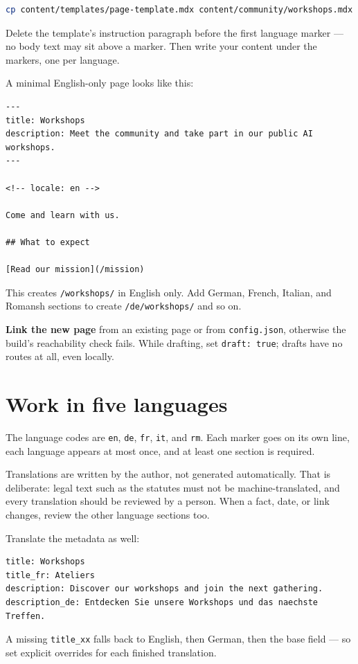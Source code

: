 \documentclass[11pt]{book}
\begin{document}
\begin{lstlisting}[language=bash]
cp content/templates/page-template.mdx content/community/workshops.mdx
\end{lstlisting}

Delete the template's instruction paragraph before the first language marker --- no body text may sit above a marker. Then write your content under the markers, one per language.

A minimal English-only page looks like this:

\begin{lstlisting}
---
title: Workshops
description: Meet the community and take part in our public AI workshops.
---

<!-- locale: en -->

Come and learn with us.

## What to expect

[Read our mission](/mission)
\end{lstlisting}

This creates \texttt{/workshops/} in English only. Add German, French, Italian, and Romansh sections to create \texttt{/de/workshops/} and so on.

\textbf{Link the new page} from an existing page or from \texttt{config.json}, otherwise the build's reachability check fails. While drafting, set \texttt{draft: true}; drafts have no routes at all, even locally.

\chapter{Work in five languages}
The language codes are \texttt{en}, \texttt{de}, \texttt{fr}, \texttt{it}, and \texttt{rm}. Each marker goes on its own line, each language appears at most once, and at least one section is required.

Translations are written by the author, not generated automatically. That is deliberate: legal text such as the statutes must not be machine-translated, and every translation should be reviewed by a person. When a fact, date, or link changes, review the other language sections too.

Translate the metadata as well:
\begin{lstlisting}
title: Workshops
title_fr: Ateliers
description: Discover our workshops and join the next gathering.
description_de: Entdecken Sie unsere Workshops und das naechste Treffen.
\end{lstlisting}
A missing \texttt{title\_xx} falls back to English, then German, then the base field --- so set explicit overrides for each finished translation.
\end{document}
